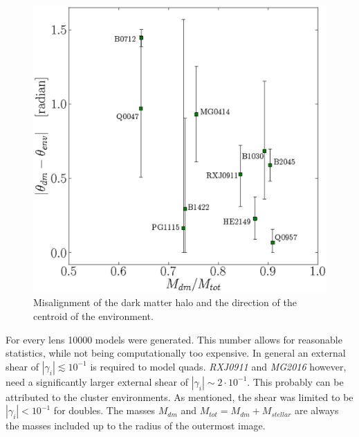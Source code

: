 \documentclass[useAMS,usenatbib]{mn2e}
\begin{document}
\begin{figure}
 \begin{center}
 \includegraphics[height=\linewidth]{Figures/g.eps}
 \caption{Misalignment of the dark matter halo and the direction of the centroid of the environment.}
 \label{fig:environmentmisalign}
 \end{center}
\end{figure}


For every lens 10000 models were generated. This number allows for reasonable statistics, while not being computationally too expensive. In general an external shear of $\left|\gamma_{i}\right| \lesssim 10^{-1}$ is required to model quads. \textit{RXJ0911} and \textit{MG2016} however, need a significantly larger external shear of $\left|\gamma_{i}\right|\sim2\cdot10^{-1}$. This probably can be attributed to the cluster environments. As mentioned, the shear was limited to be $\left|\gamma_{i}\right| < 10^{-1}$ for doubles. The masses $M_{dm}$ and $M_{tot}=M_{dm}+M_{stellar}$ are always the masses included up to the radius of the outermost image.

\end{document}
